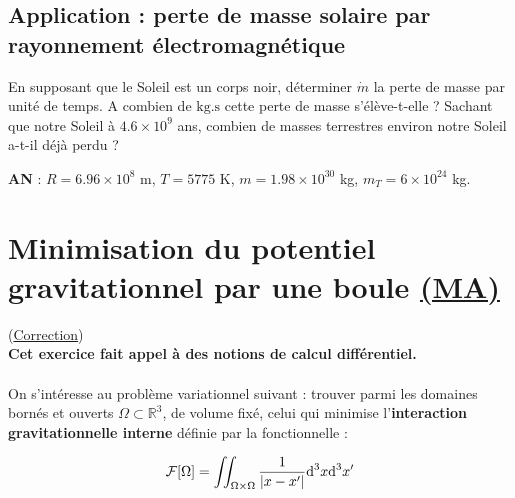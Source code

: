\documentclass[a4paper,10pt]{report}
\newcommand{\RR}{\mathbb{R}}
\begin{document}
\subsection{Application : perte de masse solaire par rayonnement électromagnétique}
En supposant que le Soleil est un corps noir, déterminer $\dot{m}$ la perte de masse par unité de temps. A combien de $\text{kg}.\text{s}$ cette perte de masse s'élève-t-elle ? Sachant que notre Soleil à $4.6\times10^9$ ans, combien de masses terrestres environ notre Soleil a-t-il déjà perdu ?

\textbf{AN} : $R = 6.96 \times 10^8$ m, $T = 5775$ K, $m = 1.98 \times 10^{30}$ kg, $m_T = 6 \times 10^{24}$ kg.

	
\newpage \section[Minimisation du potentiel gravitationnel par une boule]{Minimisation du potentiel gravitationnel par une boule \hyperref[subsubsec:analytique]{(MA)}\\ \faStar\faStar\faStar\faStar\faStar}\label{subsec:Sphère_min}
(\hyperref[subsec:correctionSphère_min]{Correction})
\\ \textbf{Cet exercice fait appel à des notions de calcul différentiel.}\\\\
On s'intéresse au problème variationnel suivant : trouver parmi les domaines bornés et ouverts $\Omega \subset \RR^3$, de volume fixé, celui qui minimise l'\textbf{interaction gravitationnelle interne} définie par la fonctionnelle :

$$
\mathcal{F}[\Omega] = \iint_{\Omega \times \Omega} \frac{1}{\abs{x - x'}} \text{d}^3{x} \text{d}^3{x'}
$$
\end{document}
